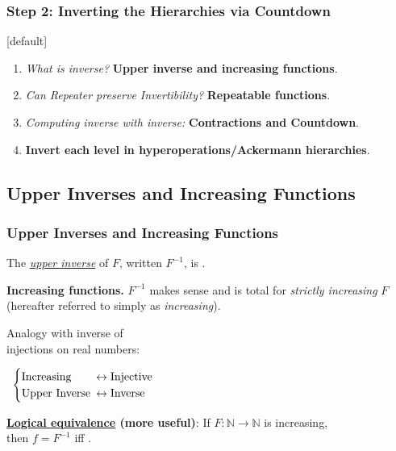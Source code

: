\begin{frame}
\frametitle{Step 2: Inverting the Hierarchies via \textbf{Countdown}}
[default]

\begin{enumerate}[\bfseries 1.]
	\itemsep 3ex
	\pause
	\item<come@6->
	\emph{What is inverse?} \textbf{Upper inverse and increasing functions}.
	
	\item<3->
	\emph{Can Repeater preserve Invertibility?} \textbf{Repeatable functions}.
	
	\item<4->
	\emph{Computing inverse with inverse:} \textbf{Contractions and Countdown}.
	
	\item<5->
	\textbf{Invert each level in hyperoperations/Ackermann hierarchies}.
\end{enumerate}
\end{frame}


\subsection{Upper Inverses and Increasing Functions}

\begin{frame}
\frametitle{Upper Inverses and Increasing Functions}
The \href{https://github.com/inv-ack/inv-ack/blob/7270e64a2600b771f2b1b1b151f7d13fb2ae6c97/inverse.v\#L28-L45}{
	\emph{upper inverse}} of $F$, written $F^{-1}$,
is .


\bigskip

\pause 
\textbf{Increasing functions.} $F^{-1}$ makes sense and is total for \emph{strictly increasing} $F$ (hereafter referred to simply as \emph{increasing}).

\bigskip

\pause 
\begin{minipage}{0.4\linewidth}
	Analogy with inverse of \\
		     injections on real numbers:
\end{minipage} \ $\begin{cases}
\text{Increasing} & \hspace{-0.5em}\leftrightarrow \text{Injective} \\
\text{Upper Inverse} & \hspace{-0.5em}\leftrightarrow \text{Inverse}
\end{cases}$

\bigskip

\pause 
\textbf{\href{https://github.com/inv-ack/inv-ack/blob/7270e64a2600b771f2b1b1b151f7d13fb2ae6c97/inverse.v\#L65-L77}{Logical equivalence} (more useful)}: If $F:\mathbb{N}\to \mathbb{N}$ is increasing, \\
then $f = F^{-1}$ iff .

\end{frame}

